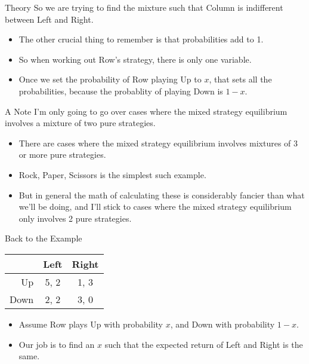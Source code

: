 \documentclass[
  ignorenonframetext,
]{beamer}
\providecommand{\tightlist}{%
  \setlength{\itemsep}{0pt}\setlength{\parskip}{0pt}}
\begin{document}
\begin{frame}{Theory}
\protect\hypertarget{theory-1}{}
So we are trying to find the mixture such that Column is indifferent
between Left and Right.

\begin{itemize}
\tightlist
\item
  The other crucial thing to remember is that probabilities add to 1.
\item
  So when working out Row's strategy, there is only one variable.
\item
  Once we set the probability of Row playing Up to \(x\), that sets all
  the probabilities, because the probablity of playing Down is \(1-x\).
\end{itemize}
\end{frame}

\begin{frame}{A Note}
\protect\hypertarget{a-note}{}
I'm only going to go over cases where the mixed strategy equilibrium
involves a mixture of two pure strategies.

\begin{itemize}
\tightlist
\item
  There are cases where the mixed strategy equilibrium involves mixtures
  of 3 or more pure strategies.
\item
  Rock, Paper, Scissors is the simplest such example.
\item
  But in general the math of calculating these is considerably fancier
  than what we'll be doing, and I'll stick to cases where the mixed
  strategy equilibrium only involves 2 pure strategies.
\end{itemize}
\end{frame}

\begin{frame}{Back to the Example}
\protect\hypertarget{back-to-the-example}{}
\begin{table}[!h]
\centering
\begin{tabular}[t]{>{}r|cc}
\toprule
 & Left & Right\\
\midrule
Up & 5, 2 & 1, 3\\
Down & 2, 2 & 3, 0\\
\bottomrule
\end{tabular}
\end{table}

\begin{itemize}
\tightlist
\item
  Assume Row plays Up with probability \(x\), and Down with probability
  \(1-x\).
\item
  Our job is to find an \(x\) such that the expected return of Left and
  Right is the same.
\end{itemize}
\end{frame}
\end{document}
